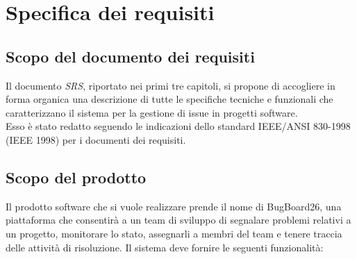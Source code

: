 
\chapter{Specifica dei requisiti} %

\label{Chapter1} %




\section{Scopo del documento dei requisiti}
\label{chap1:sec1:general_information}
Il documento \textit{SRS}, riportato nei primi tre capitoli, si propone di accogliere in forma organica una descrizione di tutte le specifiche tecniche e funzionali che caratterizzano il sistema per la gestione di issue in progetti software. \\
Esso è stato redatto seguendo le indicazioni dello standard IEEE/ANSI 830-1998 (IEEE 1998) per i documenti dei requisiti.

\section{Scopo del prodotto}

Il prodotto software che si vuole realizzare prende il nome di BugBoard26, una piattaforma che consentirà a un team di sviluppo di segnalare problemi relativi a un progetto, monitorare lo stato, assegnarli a membri del team e tenere traccia delle attività di risoluzione. Il sistema deve fornire le seguenti funzionalità:

